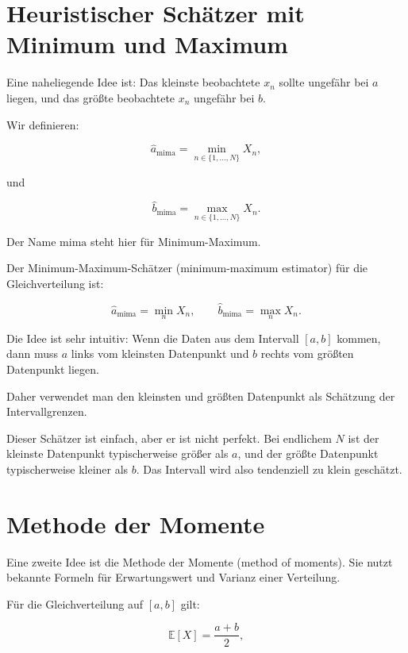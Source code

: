 \section{Heuristischer Schätzer mit Minimum und Maximum}

Eine naheliegende Idee ist:
Das kleinste beobachtete \(x_n\) sollte ungefähr bei \(a\) liegen, und das größte beobachtete \(x_n\) ungefähr bei \(b\).

Wir definieren:

\[
    \hat{a}_{\mathrm{mima}}
    =
    \min_{n \in \{1,\dots,N\}} X_n,
\]

und

\[
    \hat{b}_{\mathrm{mima}}
    =
    \max_{n \in \{1,\dots,N\}} X_n.
\]

Der Name \(\mathrm{mima}\) steht hier für Minimum-Maximum.

\begin{definitionbox}
Der Minimum-Maximum-Schätzer (minimum-maximum estimator) für die Gleichverteilung ist:

\[
    \hat{a}_{\mathrm{mima}}
    =
    \min_n X_n,
    \qquad
    \hat{b}_{\mathrm{mima}}
    =
    \max_n X_n.
\]
\end{definitionbox}

\begin{conceptbox}
Die Idee ist sehr intuitiv:
Wenn die Daten aus dem Intervall \([a,b]\) kommen, dann muss \(a\) links vom kleinsten Datenpunkt und \(b\) rechts vom größten Datenpunkt liegen.

Daher verwendet man den kleinsten und größten Datenpunkt als Schätzung der Intervallgrenzen.
\end{conceptbox}

Dieser Schätzer ist einfach, aber er ist nicht perfekt.
Bei endlichem \(N\) ist der kleinste Datenpunkt typischerweise größer als \(a\), und der größte Datenpunkt typischerweise kleiner als \(b\).
Das Intervall wird also tendenziell zu klein geschätzt.

\section{Methode der Momente}

Eine zweite Idee ist die Methode der Momente (method of moments).
Sie nutzt bekannte Formeln für Erwartungswert und Varianz einer Verteilung.

Für die Gleichverteilung auf \([a,b]\) gilt:

\[
    \mathbb{E}[X]
    =
    \frac{a+b}{2},
\]

